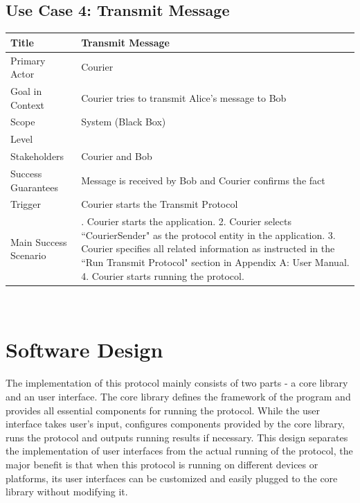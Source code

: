 \subsection*{Use Case 4: Transmit Message}
\begin{tabular}{|l|p{}|}
 \hline
 Title & Transmit Message \\ \hline
 Primary Actor & Courier \\ \hline
 Goal in Context & Courier tries to transmit Alice's message to Bob \\ \hline
 Scope & System (Black Box) \\ \hline
 Level & \\ \hline
 Stakeholders & Courier and Bob\\ \hline
 Success Guarantees & Message is received by Bob and Courier confirms the fact \\ \hline
 Trigger & Courier starts the Transmit Protocol \\ \hline
 Main Success Scenario & 
 \parbox{9cm}{
  . Courier starts the application.
  2. Courier selects ``CourierSender" as the protocol entity in the application.
  3. Courier specifies all related information as instructed in the ``Run Transmit Protocol" section in Appendix A: User Manual.
  4. Courier starts running the protocol.
  \medskip
 }
 \\ \hline
\end{tabular}
\\

\section{Software Design}
The implementation of this protocol mainly consists of two parts - a core library and an user interface. The core library defines the framework of the program and provides all essential components for running the protocol. While the user interface takes user's input, configures components provided by the core library, runs the protocol and outputs running results if necessary. This design separates the implementation of user interfaces from the actual running of the protocol, the major benefit is that when this protocol is running on different devices or platforms, its user interfaces can be customized and easily plugged to the core library without modifying it.

